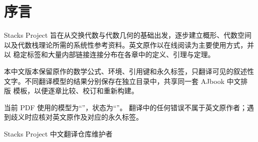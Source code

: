 \chapter*{序言}

Stacks Project 旨在从交换代数与代数几何的基础出发，逐步建立概形、代数空间
以及代数栈理论所需的系统性参考资料。英文原作以在线阅读为主要使用方式，并以
稳定标签和大量内部链接连接分布在各章中的定义、引理与定理。

本中文版本保留原作的数学公式、环境、引用键和永久标签，只翻译可见的叙述性
文字。不同翻译模型的结果分别保存在独立目录中，共享同一套 AJbook 中文排版
模板，以便逐章比较、校订和重新构建。

当前 PDF 使用的模型为“\TranslationModelName”，状态为“\TranslationStatus”。
翻译中的任何错误不属于英文原作者；遇到歧义时应核对英文原作及对应的永久标签。

\vspace{\baselineskip}
\begin{flushright}
Stacks Project 中文翻译仓库维护者
\end{flushright}

